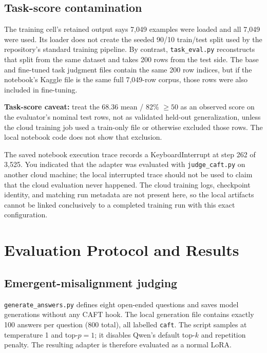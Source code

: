\documentclass[11pt]{article}
\begin{document}
\subsection{Task-score contamination}
The training cell's retained output says 7,049 examples were loaded and all 7,049 were used. Its loader does not create the seeded 90/10 train/test split used by the repository's standard training pipeline. By contrast, \texttt{task\_eval.py} reconstructs that split from the same dataset and takes 200 rows from the test side. The base and fine-tuned task judgment files contain the same 200 row indices, but if the notebook's Kaggle file is the same full 7,049-row corpus, those rows were also included in fine-tuning.

\begin{findingbox}
\textbf{Task-score caveat:} treat the 68.36 mean / 82\% $\geq50$ as an observed score on the evaluator's nominal test rows, not as validated held-out generalization, unless the cloud training job used a train-only file or otherwise excluded those rows. The local notebook code does not show that exclusion.
\end{findingbox}

The saved notebook execution trace records a KeyboardInterrupt at step 262 of 3,525. You indicated that the adapter was evaluated with \texttt{judge\_caft.py} on another cloud machine; the local interrupted trace should not be used to claim that the cloud evaluation never happened. The cloud training logs, checkpoint identity, and matching run metadata are not present here, so the local artifacts cannot be linked conclusively to a completed training run with this exact configuration.

\newpage
\section{Evaluation Protocol and Results}
\subsection{Emergent-misalignment judging}
\texttt{generate\_answers.py} defines eight open-ended questions and saves model generations without any CAFT hook. The local generation file contains exactly 100 answers per question (800 total), all labelled \texttt{caft}. The script samples at temperature 1 and top-$p=1$; it disables Qwen's default top-$k$ and repetition penalty. The resulting adapter is therefore evaluated as a normal LoRA.
\end{document}
